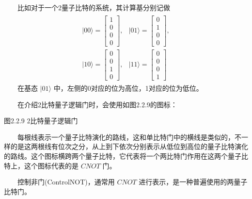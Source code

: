 \documentclass[a4paper,11pt,english]{sphinxmanual}
\let\sphinxpxdimen\pdfpxdimen\else\newdimen\sphinxpxdimen
\begin{document}
\sphinxAtStartPar
  比如对于一个2量子比特的系统，其计算基分别记做
\begin{equation*}
\begin{split}\begin{array}{ll} |00\rangle=\left[\begin{array}{l} 1 \\ 0 \\ 0 \\ 0 \end{array}\right], & |01\rangle=\left[\begin{array}{l} 0 \\ 1 \\ 0 \\ 0 \end{array}\right], \\ |10\rangle=\left[\begin{array}{l} 0 \\ 0 \\ 1 \\ 0 \end{array}\right], & |11\rangle=\left[\begin{array}{l} 0 \\ 0 \\ 0 \\ 1 \end{array}\right] \end{array}\end{split}
\end{equation*}
\sphinxAtStartPar
  在基态 \(|01 \rangle\) 中，左侧的0对应的位为高位，1对应的位为低位。

\sphinxAtStartPar
  在介绍2比特量子逻辑门时，会使用如图2.2.9的图标：

\noindent{\hspace*{\fill}\sphinxincludegraphics[width=300\sphinxpxdimen]{{2.2.9}.png}\hspace*{\fill}}

\begin{center}图2.2.9 2比特量子逻辑门
\end{center}
\sphinxAtStartPar
  每根线表示一个量子比特演化的路线，这和单比特门中的横线是类似的，不一样的是这两根线有位次之分，从上到下依次分别表示从低位到高位的量子比特演化的路线。这个图标横跨两个量子比特，它代表将一个两比特门作用在这两个量子比特上，这个图标代表的是 \(CNOT\) 门。

\sphinxAtStartPar
{}

\sphinxAtStartPar
  控制非门(Control\sphinxhyphen{}NOT)，通常用 \(CNOT\) 进行表示，是一种普遍使用的两量子比特门。
\end{document}
